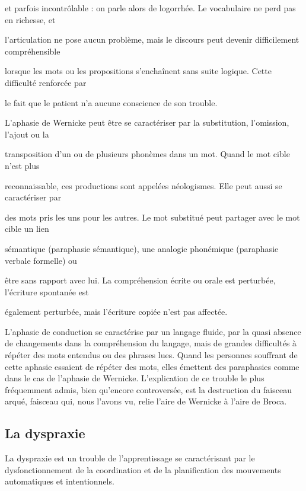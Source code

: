 et parfois incontrôlable : on parle alors de logorrhée. Le vocabulaire ne perd pas en richesse, et

l'articulation ne pose aucun problème, mais le discours peut devenir difficilement compréhensible

lorsque les mots ou les propositions s’enchaînent sans suite logique. Cette difficulté renforcée par

le fait que le patient n’a aucune conscience de son trouble.

L’aphasie de Wernicke peut être se caractériser par la substitution, l’omission, l'ajout ou la

transposition d’un ou de plusieurs phonèmes dans un mot. Quand le mot cible n’est plus

reconnaissable, ces productions sont appelées néologismes. Elle peut aussi se caractériser par

des mots pris les uns pour les autres. Le mot substitué peut partager avec le mot cible un lien


sémantique (paraphasie sémantique), une analogie phonémique (paraphasie verbale formelle) ou

être sans rapport avec lui. La compréhension écrite ou orale est perturbée, l'écriture spontanée est

également perturbée, mais l'écriture copiée n'est pas affectée.

L'aphasie de conduction se caractérise par un langage fluide, par la quasi absence de changements
dans la compréhension du langage, mais de grandes difficultés à répéter des mots entendus ou des
phrases lues. Quand les personnes souffrant de cette aphasie essaient de répéter des mots, elles
émettent des paraphasies comme dans le cas de l’aphasie de Wernicke. L'explication de ce trouble
le plus fréquemment admis, bien qu’encore controversée, est la destruction du faisceau arqué,
faisceau qui, nous l'avons vu, relie l'aire de Wernicke à l'aire de Broca.

\subsection{La dyspraxie}

La dyspraxie est un trouble de l’apprentissage se caractérisant par le dysfonctionnement de la
coordination et de la planification des mouvements automatiques et intentionnels.

